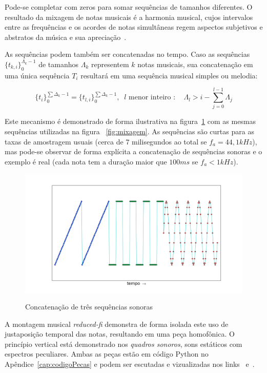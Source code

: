 Pode-se completar com zeros para somar sequências de tamanhos diferentes. O resultado da mixagem de notas musicais é a harmonia musical, cujos intervalos entre as frequências e os acordes de notas simultâneas regem aspectos subjetivos e abstratos da música e sua apreciação~\cite{Harmonia}. 

As sequências podem também ser concatenadas no tempo. Caso as sequências $\{t_{k,i}\}_0^{\Lambda_k-1}$ de tamanhos $\Lambda_k$  representem $k$ notas musicais, sua concatenação em uma única sequência $T_i$ resultará em uma sequência musical simples ou melodia:

\begin{equation}\label{eq:concatenacao}
\{t_i\}_0^{\sum\Delta_k-1}=\{t_{l,i}\}_0^{\sum\Delta_k-1}, \;\; l\text{ menor inteiro } : \quad \Lambda_l > i -\sum_{j=0}^{l-1}\Lambda_j
\end{equation}

Este mecanismo é demonstrado de forma ilustrativa na figura~\ref{fig:concatenacao} com as mesmas sequências utilizadas na figura ~\ref{fig:mixagem}.
 As sequências são curtas para as taxas de amostragem usuais (cerca de $7$ milisegundos ao total se $f_a=44,1kHz$), mas pode-se observar de forma explícita a concatenação de sequências sonoras e o exemplo é real (cada nota tem a duração maior que $100ms$ se $f_a<1kHz$).

\begin{figure}[h!]
    \centering
    \caption{Concatenação de três sequências sonoras}
        \includegraphics[width=\textwidth]{figuras/concatenacao}
        \label{fig:concatenacao}
\end{figure}

A montagem musical \emph{reduced-fi} demonstra de forma isolada este uso de justaposição temporal das notas, resultando em uma peça homofônica. O princípio vertical está demonstrado nos \emph{quadros sonoros}, sons estáticos com espectros peculiares. Ambas as peças estão em código Python no Apêndice~\ref{cap:codigoPecas} e podem ser escutadas e vizualizadas nos links~\cite{reduced-fi} e~\cite{quadros}.

